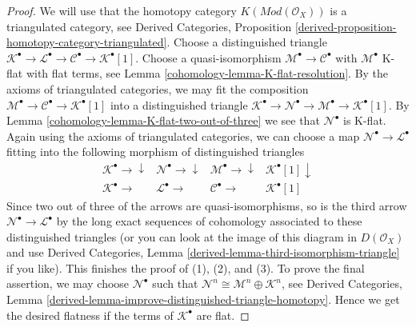 \begin{proof}

We will use that the homotopy category $K(\textit{Mod}(\mathcal{O}_X))$
is a triangulated category, see Derived Categories, Proposition
\ref{derived-proposition-homotopy-category-triangulated}.
Choose a distinguished triangle
$\mathcal{K}^\bullet \to \mathcal{L}^\bullet \to
\mathcal{C}^\bullet \to \mathcal{K}^\bullet[1]$.
Choose a quasi-isomorphism $\mathcal{M}^\bullet \to \mathcal{C}^\bullet$ with
$\mathcal{M}^\bullet$ K-flat with flat terms, see
Lemma \ref{cohomology-lemma-K-flat-resolution}.
By the axioms of triangulated categories,
we may fit the composition
$\mathcal{M}^\bullet \to \mathcal{C}^\bullet \to \mathcal{K}^\bullet[1]$
into a distinguished triangle
$\mathcal{K}^\bullet \to \mathcal{N}^\bullet \to
\mathcal{M}^\bullet \to \mathcal{K}^\bullet[1]$.
By Lemma \ref{cohomology-lemma-K-flat-two-out-of-three} we see that
$\mathcal{N}^\bullet$ is K-flat.
Again using the axioms of triangulated categories,
we can choose a map $\mathcal{N}^\bullet \to \mathcal{L}^\bullet$ fitting into
the following morphism of distinguished triangles
$$
\begin{array}{cccc}\mathcal{K}^\bullet \longrightarrow\downarrow & \mathcal{N}^\bullet \longrightarrow\downarrow & \mathcal{M}^\bullet \longrightarrow\downarrow & \mathcal{K}^\bullet[1] \downarrow \\ \mathcal{K}^\bullet \longrightarrow & \mathcal{L}^\bullet \longrightarrow & \mathcal{C}^\bullet \longrightarrow & \mathcal{K}^\bullet[1]\end{array}
$$
Since two out of three of the arrows are quasi-isomorphisms, so is
the third arrow $\mathcal{N}^\bullet \to \mathcal{L}^\bullet$
by the long exact sequences
of cohomology associated to these distinguished triangles
(or you can look at the image of this diagram in $D(\mathcal{O}_X)$ and use
Derived Categories, Lemma \ref{derived-lemma-third-isomorphism-triangle}
if you like). This finishes the proof of (1), (2), and (3).
To prove the final assertion, we may choose $\mathcal{N}^\bullet$
such that $\mathcal{N}^n \cong \mathcal{M}^n \oplus \mathcal{K}^n$, see
Derived Categories, Lemma
\ref{derived-lemma-improve-distinguished-triangle-homotopy}.
Hence we get the desired flatness
if the terms of $\mathcal{K}^\bullet$ are flat.
\end{proof}

